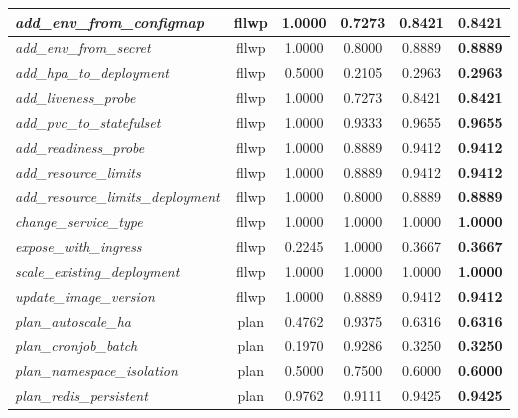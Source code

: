 \begin{footnotesize}
\begin{longtable}{|p{3.6cm}|c|c|c|c|c|}
\hline
\textit{add\_\allowbreak{}env\_\allowbreak{}from\_\allowbreak{}configmap} & fllwp & 1.0000 & 0.7273 & 0.8421 & \textbf{0.8421} \\
\hline
\textit{add\_\allowbreak{}env\_\allowbreak{}from\_\allowbreak{}secret} & fllwp & 1.0000 & 0.8000 & 0.8889 & \textbf{0.8889} \\
\hline
\textit{add\_\allowbreak{}hpa\_\allowbreak{}to\_\allowbreak{}deployment} & fllwp & 0.5000 & 0.2105 & 0.2963 & \textbf{0.2963} \\
\hline
\textit{add\_\allowbreak{}liveness\_\allowbreak{}probe} & fllwp & 1.0000 & 0.7273 & 0.8421 & \textbf{0.8421} \\
\hline
\textit{add\_\allowbreak{}pvc\_\allowbreak{}to\_\allowbreak{}statefulset} & fllwp & 1.0000 & 0.9333 & 0.9655 & \textbf{0.9655} \\
\hline
\textit{add\_\allowbreak{}readiness\_\allowbreak{}probe} & fllwp & 1.0000 & 0.8889 & 0.9412 & \textbf{0.9412} \\
\hline
\textit{add\_\allowbreak{}resource\_\allowbreak{}limits} & fllwp & 1.0000 & 0.8889 & 0.9412 & \textbf{0.9412} \\
\hline
\textit{add\_\allowbreak{}resource\_\allowbreak{}limits\_\allowbreak{}deployment} & fllwp & 1.0000 & 0.8000 & 0.8889 & \textbf{0.8889} \\
\hline
\textit{change\_\allowbreak{}service\_\allowbreak{}type} & fllwp & 1.0000 & 1.0000 & 1.0000 & \textbf{1.0000} \\
\hline
\textit{expose\_\allowbreak{}with\_\allowbreak{}ingress} & fllwp & 0.2245 & 1.0000 & 0.3667 & \textbf{0.3667} \\
\hline
\textit{scale\_\allowbreak{}existing\_\allowbreak{}deployment} & fllwp & 1.0000 & 1.0000 & 1.0000 & \textbf{1.0000} \\
\hline
\textit{update\_\allowbreak{}image\_\allowbreak{}version} & fllwp & 1.0000 & 0.8889 & 0.9412 & \textbf{0.9412} \\
\hline
\textit{plan\_\allowbreak{}autoscale\_\allowbreak{}ha} & plan & 0.4762 & 0.9375 & 0.6316 & \textbf{0.6316} \\
\hline
\textit{plan\_\allowbreak{}cronjob\_\allowbreak{}batch} & plan & 0.1970 & 0.9286 & 0.3250 & \textbf{0.3250} \\
\hline
\textit{plan\_\allowbreak{}namespace\_\allowbreak{}isolation} & plan & 0.5000 & 0.7500 & 0.6000 & \textbf{0.6000} \\
\hline
\textit{plan\_\allowbreak{}redis\_\allowbreak{}persistent} & plan & 0.9762 & 0.9111 & 0.9425 & \textbf{0.9425} \\

\end{longtable}
\end{footnotesize}
